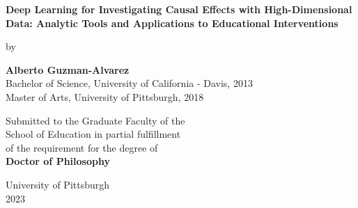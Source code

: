 
   \begin{center}
        \begin{singlespace}
            \textbf{Deep Learning for Investigating Causal Effects with High-Dimensional Data: Analytic Tools and Applications to Educational Interventions}
        \end{singlespace}
        
       \vspace*{7\baselineskip}
        by
            
        \textbf{Alberto Guzman-Alvarez}\\
        Bachelor of Science, University of California - Davis, 2013\\
        Master of Arts, University of Pittsburgh, 2018\\
        
       \vspace*{8\baselineskip}
        
        Submitted to the Graduate Faculty of the\\
        School of Education in partial fulfillment\\
        of the requirement for the degree of\\
        \textbf{Doctor of Philosophy}
            
       \vspace*{3\baselineskip}

        University of Pittsburgh\\ 
        2023
    \end{center}

	
	